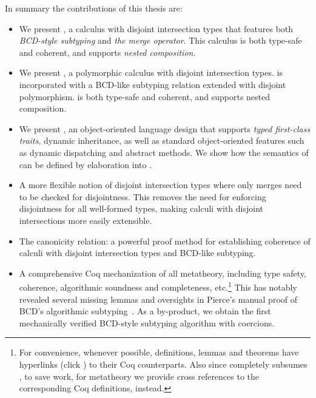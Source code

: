 In summary the contributions of this thesis are:

\begin{itemize}

\item We present \namee, a calculus with disjoint intersection types that
  features both \emph{BCD-style subtyping} and \emph{the merge operator}. This
  calculus is both type-safe and coherent, and supports \emph{nested composition}.

\item We present \fnamee, a polymorphic calculus with disjoint intersection
  types. \fnamee is incorporated with a BCD-like subtyping relation extended
  with disjoint polymorphism. \fnamee is both type-safe and coherent, and
  supports nested composition.

\item We present \sedel, an object-oriented language design that supports
  \emph{typed first-class traits}, dynamic inheritance, as well as standard
  object-oriented features such as dynamic dispatching and abstract methods. We
  show how the semantics of \sedel can be defined by elaboration into \fnamee.

\item A more flexible notion of disjoint intersection types where only merges
  need to be checked for disjointness. This removes the need for enforcing
  disjointness for all well-formed types, making calculi with disjoint
  intersections more easily extensible.

\item The canonicity relation: a powerful proof method for establishing
  coherence of calculi with disjoint intersection types and BCD-like subtyping.

\item A comprehensive Coq mechanization of all metatheory, including type
  safety, coherence, algorithmic soundness and completeness, etc.\footnote{For
    convenience, whenever possible, definitions, lemmas and theorems have hyperlinks (click
    \href{https://github.com/bixuanzju/phd-thesis-artifact}{\leftpointright}) to their Coq counterparts. Also since \fnamee completely
    subsumes \namee, to save work, for \namee metatheory we provide cross
    references to the corresponding \fnamee Coq definitions, instead.} This has
  notably revealed several missing lemmas and oversights in Pierce's manual
  proof of BCD's algorithmic subtyping~\citep{pierce1989decision}. As a
  by-product, we obtain the first mechanically verified BCD-style subtyping
  algorithm with coercions.


\end{itemize}

